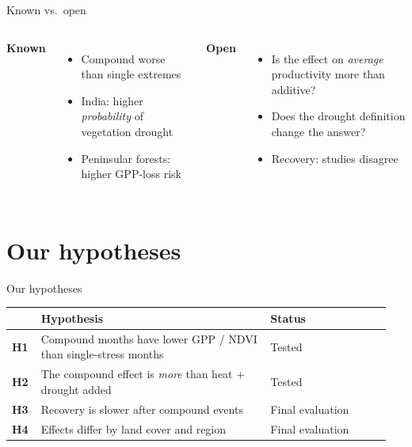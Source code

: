 \documentclass[11pt,aspectratio=169]{beamer}
\begin{document}
\begin{frame}{Known vs.\ open}
  \begin{columns}[T]
    \textbf{Known}
    \begin{itemize}
      \item Compound worse than single extremes \citep{vonbuttlar2018}
      \item India: higher \emph{probability} of vegetation drought
        \citep{meena2026}
      \item Peninsular forests: higher GPP-loss risk \citep{sen2026}
    \end{itemize}
    \textbf{Open}
    \begin{itemize}
      \item Is the effect on \emph{average} productivity more than additive?
      \item Does the drought definition change the answer? \citep{liang2026}
      \item Recovery: studies disagree \citep{yao2024,feng2026}
    \end{itemize}
  \end{columns}
\end{frame}

\section{Our hypotheses}

\begin{frame}{Our hypotheses}
  \renewcommand{\arraystretch}{1.3}
  \begin{tabular}{@{}L{0.07\linewidth}L{0.58\linewidth}L{0.3\linewidth}@{}}
    \toprule
    & \textbf{Hypothesis} & \textbf{Status} \\
    \midrule
    \textbf{H1} & Compound months have lower GPP / NDVI than single-stress months & Tested \\
    \textbf{H2} & The compound effect is \emph{more} than heat + drought added & Tested \\
    \textbf{H3} & Recovery is slower after compound events & Final evaluation \\
    \textbf{H4} & Effects differ by land cover and region & Final evaluation \\
    \bottomrule
  \end{tabular}
\end{frame}
\end{document}
